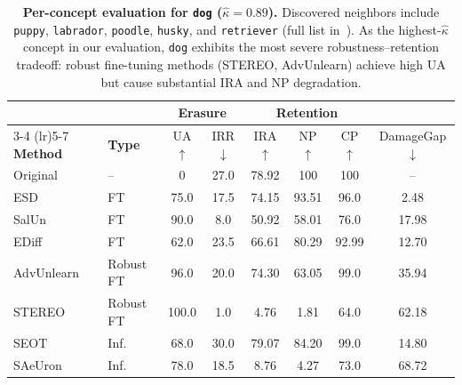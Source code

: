 \begin{table}[h]
\centering
\small
\setlength{\tabcolsep}{5pt}
\begin{tabular}{llcccccc}
\toprule
& & \multicolumn{2}{c}{\textbf{Erasure}} & \multicolumn{3}{c}{\textbf{Retention}} & \\
\cmidrule(lr){3-4} \cmidrule(lr){5-7}
\textbf{Method} & \textbf{Type} & UA$\uparrow$ & IRR$\downarrow$ & IRA$\uparrow$ & NP$\uparrow$ & CP$\uparrow$ & DamageGap$\downarrow$ \\
\midrule
Original    & --          & 0     & 27.0  & 78.92 & 100   & 100   & --    \\
\midrule
ESD         & FT          & 75.0  & 17.5  & 74.15 & 93.51 & 96.0  & 2.48  \\
SalUn       & FT          & 90.0  & 8.0   & 50.92 & 58.01 & 76.0  & 17.98 \\
EDiff       & FT          & 62.0  & 23.5  & 66.61 & 80.29 & 92.99 & 12.70 \\
\midrule
AdvUnlearn  & Robust FT   & 96.0  & 20.0  & 74.30 & 63.05 & 99.0  & 35.94 \\
STEREO      & Robust FT   & 100.0 & 1.0   & 4.76  & 1.81  & 64.0  & 62.18 \\
\midrule
SEOT        & Inf.        & 68.0  & 30.0  & 79.07 & 84.20 & 99.0  & 14.80 \\
SAeUron     & Inf.        & 78.0  & 18.5  & 8.76  & 4.27  & 73.0  & 68.72 \\
\bottomrule
\end{tabular}
\caption{\textbf{Per-concept evaluation for \texttt{dog} ($\hat\kappa = 0.89$).} Discovered neighbors include \texttt{puppy}, \texttt{labrador}, \texttt{poodle}, \texttt{husky}, and \texttt{retriever} (full list in~). As the highest-$\hat\kappa$ concept in our evaluation, \texttt{dog} exhibits the most severe robustness--retention tradeoff: robust fine-tuning methods (STEREO, AdvUnlearn) achieve high UA but cause substantial IRA and NP degradation.}
\label{tab:per_concept_dog}
\end{table}

